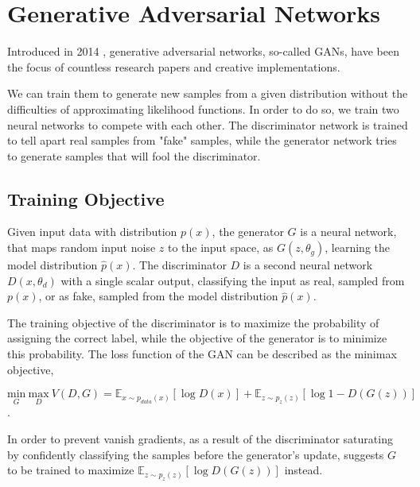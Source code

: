 \documentclass{article}
\begin{document}
\section{Generative Adversarial Networks}


Introduced in 2014 \cite{goodfellow_generative_2014}, generative adversarial  networks, so-called GANs, have been the focus of countless research papers and creative implementations.

We can train them to generate new samples from a given distribution without the difficulties of approximating likelihood functions. In order to do so, we train two neural networks to compete with each other. The discriminator network is trained to tell apart real samples from "fake" samples, while the generator network tries to generate samples that will fool the discriminator.

\subsection{Training Objective} \label{sec:GAN_training}
Given input data with distribution $p(x)$, the generator $G$ is a neural network, that maps random input noise $z$ to the input space, as $G(z, \theta_{g})$, learning the model distribution $\hat{p}(x)$. The discriminator $D$ is a second neural network $D(x, \theta_{d})$ with a single scalar output, classifying the input as real, sampled from $p(x)$, or as fake, sampled from the model distribution $\hat{p}(x)$. 

The training objective of the discriminator is to maximize the probability of assigning the correct label, while the objective of the generator is to minimize this probability. The loss function of the GAN can be described as the minimax objective,

\begin{equation}
\underset{G}{\mathrm{min}} \ \underset{D}{\mathrm{max}} \ V(D,G) = \mathbb{E}_{x \sim p_{data}(x)}[\log D(x)] + \mathbb{E}_{z \sim p_{z}(z)}[\log 1 - D(G(z))]
\label{eq:minimax}
\end{equation}.

In order to prevent vanish gradients, as a result of the discriminator saturating by confidently classifying the samples before the generator's update, \cite{goodfellow_generative_2014} suggests $G$ to be trained to maximize $\mathbb{E}_{z \sim p_{z}(z)}[\log D(G(z))]$ instead.
\end{document}

